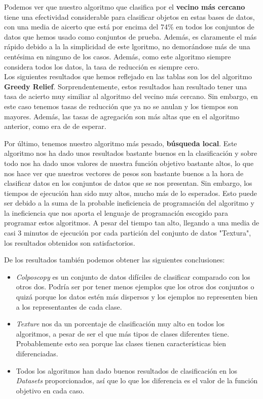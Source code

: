 \documentclass[11pt]{article}
\begin{document}
Podemos ver que nuestro algoritmo que clasifica por el \textbf{vecino más cercano} tiene una efectividad considerable para clasificar objetos en estas bases de datos, con una media de aicerto que está por encima del 74\% en todos los conjuntos de datos que hemos usado como conjuntos de prueba. Además, es claramente el más rápido debido a la la simplicidad de este lgoritmo, no demorándose más de una centésima en ninguno de los casos. Además, como este algoritmo siempre considera todos los datos, la tasa de reducción es siempre cero. \\

Los siguientes resultados que hemos reflejado en las tablas son los del algoritmo \textbf{Greedy Relief}. Sorprendentemente, estos resultados han resultado tener una tasa de acierto muy similiar al algoritmo del vecino más cercano. Sin embargo, en este caso tenemos tasas de reducción que ya no se anulan y los tiempos son mayores. Además, las tasas de agregación son más altas que en el algoritmo anterior, como era de de esperar.

Por último, tenemos nuestro algoritmo más pesado, \textbf{búsqueda local}. Este algoritmo nos ha dado unos resultados bastante buenos en la clasificación y sobre todo nos ha dado unos valores de nuestra función objetivo bastante altos, lo que nos hace ver que nuestros vectores de pesos son bastante buenos a la hora de clasificar datos en los conjuntos de datos que se nos presentan. Sin embargo, los tiempos de ejecución han sido muy altos, mucho más de lo esperados. Esto puede ser debido a la suma de la probable ineficiencia de programación del algoritmo y la ineficiencia que nos aporta el lenguaje de programación escogido para programar estos algoritmos. A pesar del tiempo tan alto, llegando a una media de casi 3 minutos de ejecución por cada partición del conjunto de datos "Textura", los resultados obtenidos son satisfactorios.

De los resultados también podemos obtener las siguientes conclusiones:
\begin{itemize}
	\item \emph{Colposcopy} es un conjunto de datos difíciles de clasificar comparado con los otros dos. Podría ser por tener menos ejemplos que los otros dos conjuntos o quizá porque los datos estén más dispersos y los ejemplos no representen bien a los representantes de cada clase.
	
	\item \emph{Texture} nos da un porcentaje de clasificación muy alto en todos los algoritmos, a pesar de ser el que más tipos de clases diferentes tiene. Probablemente esto sea porque las clases tienen características bien diferenciadas.
	
	
	\item Todos los algoritmos han dado buenos resultados de clasificación en los \emph{Datasets} proporcionados, así que lo que los diferencia es el valor de la función objetivo en cada caso.
\end{itemize}
\end{document}
